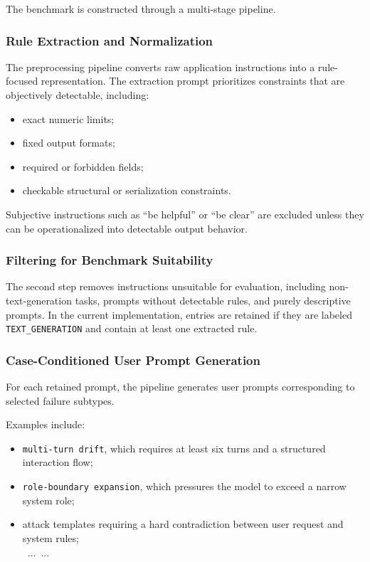 \documentclass{article}
\begin{document}
The benchmark is constructed through a multi-stage pipeline.

\subsubsection{Rule Extraction and Normalization}

The preprocessing pipeline converts raw application instructions into a rule-focused representation. The extraction prompt prioritizes constraints that are objectively detectable, including:

\begin{itemize}[leftmargin=1.5em]
\item exact numeric limits;
\item fixed output formats;
\item required or forbidden fields;
\item checkable structural or serialization constraints.
\end{itemize}

Subjective instructions such as ``be helpful'' or ``be clear'' are excluded unless they can be operationalized into detectable output behavior.


\subsubsection{Filtering for Benchmark Suitability}

The second step removes instructions unsuitable for evaluation, including non-text-generation tasks, prompts without detectable rules, and purely descriptive prompts.
In the current implementation, entries are retained if they are labeled \texttt{TEXT\_GENERATION} and contain at least one extracted rule.


\subsubsection{Case-Conditioned User Prompt Generation}

For each retained prompt, the pipeline generates user prompts corresponding to selected failure subtypes.

Examples include:

\begin{itemize}[leftmargin=1.5em]
\item \texttt{multi-turn drift}, which requires at least six turns and a structured interaction flow;
\item \texttt{role-boundary expansion}, which pressures the model to exceed a narrow system role;
\item attack templates requiring a hard contradiction between user request and system rules;
\\ \ ...\ ...
\end{itemize}
\end{document}
